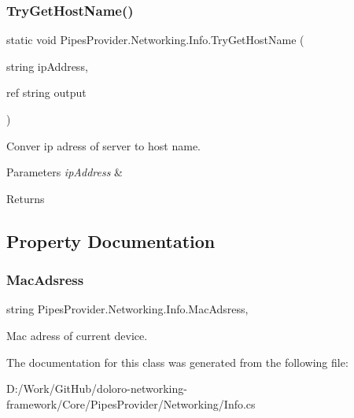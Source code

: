 \subsubsection{\texorpdfstring{Try\+Get\+Host\+Name()}{TryGetHostName()}}
{\footnotesize\ttfamily static void Pipes\+Provider.\+Networking.\+Info.\+Try\+Get\+Host\+Name (\begin{DoxyParamCaption}\item[{string}]{ip\+Address,  }\item[{ref string}]{output }\end{DoxyParamCaption})\hspace{0.3cm}{\ttfamily [static]}}



Conver ip adress of server to host name. 


\begin{DoxyParams}{Parameters}
{\em ip\+Address} & \\
\hline
\end{DoxyParams}
\begin{DoxyReturn}{Returns}

\end{DoxyReturn}


\subsection{Property Documentation}
\mbox{\label{class_pipes_provider_1_1_networking_1_1_info_a1f52d4e0fadf66135920386cd23473a2}} 
\subsubsection{\texorpdfstring{Mac\+Adsress}{MacAdsress}}
{\footnotesize\ttfamily string Pipes\+Provider.\+Networking.\+Info.\+Mac\+Adsress\hspace{0.3cm}{\ttfamily [static]}, {\ttfamily [get]}}



Mac adress of current device. 



The documentation for this class was generated from the following file\+:\begin{DoxyCompactItemize}
\item 
D\+:/\+Work/\+Git\+Hub/doloro-\/networking-\/framework/\+Core/\+Pipes\+Provider/\+Networking/Info.\+cs\end{DoxyCompactItemize}
